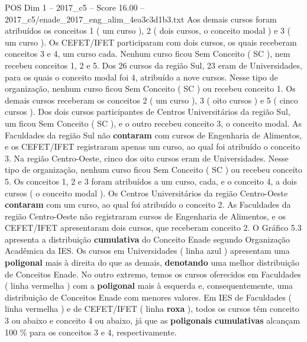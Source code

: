 \begin{textsample}{POS Dim 1 – 2017\_c5 – Score 16.00 – 2017\_c5/enade\_2017\_eng\_alim\_4ea3c3d1b3.txt}
Aos demais cursos foram atribuídos os conceitos 1 ( um curso ), 2 ( dois cursos, o conceito modal ) e 3 ( um curso ).
Os CEFET/IFET participaram com dois cursos, os quais receberam conceitos 3 e 4, um curso cada.
Nenhum curso ficou Sem Conceito ( SC ), nem recebeu conceitos 1, 2 e 5.
Dos 26 cursos da região Sul, 23 eram de Universidades, para os quais o conceito modal foi 4, atribuído a nove cursos.
Nesse tipo de organização, nenhum curso ficou Sem Conceito ( SC ) ou recebeu conceito 1.
Os demais cursos receberam os conceitos 2 ( um curso ), 3 ( oito cursos ) e 5 ( cinco cursos ).
Dos dois cursos participantes de Centros Universitários da região Sul, um ficou Sem Conceito ( SC ), e o outro recebeu conceito 3, o conceito modal.
As Faculdades da região Sul não \textbf{contaram} com cursos de Engenharia de Alimentos, e os CEFET/IFET registraram apenas um curso, ao qual foi atribuído o conceito 3.
Na região Centro-Oeste, cinco dos oito cursos eram de Universidades.
Nesse tipo de organização, nenhum curso ficou Sem Conceito ( SC ) ou recebeu conceito 5.
Os conceitos 1, 2 e 3 foram atribuídos a um curso, cada, e o conceito 4, a dois cursos ( o conceito modal ).
Os Centros Universitários da região Centro-Oeste \textbf{contaram} com um curso, ao qual foi atribuído o conceito 2.
As Faculdades da região Centro-Oeste não registraram cursos de Engenharia de Alimentos, e os CEFET/IFET apresentaram dois cursos, que receberam conceito 2.
O Gráfico 5.3 apresenta a distribuição \textbf{cumulativa} do Conceito Enade segundo Organização Acadêmica da IES.
Os cursos em Universidades ( linha azul ) apresentam uma \textbf{poligonal} mais à direita do que as demais, \textbf{denotando} uma melhor distribuição de Conceitos Enade.
No outro extremo, temos os cursos oferecidos em Faculdades ( linha vermelha ) com a \textbf{poligonal} mais à esquerda e, consequentemente, uma distribuição de Conceitos Enade com menores valores.
Em IES de Faculdades ( linha vermelha ) e de CEFET/IFET ( linha \textbf{roxa} ), todos os cursos têm conceito 3 ou abaixo e conceito 4 ou abaixo, já que as \textbf{poligonais} \textbf{cumulativas} alcançam 100 \% para os conceitos 3 e 4, respectivamente.

\end{textsample}
